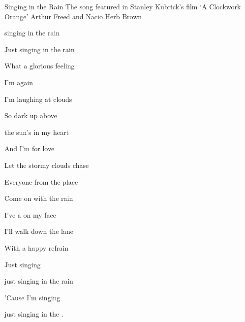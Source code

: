 \begin{SBSong}{Singing in the Rain}
  {The song featured in Stanley Kubrick's film `A Clockwork Orange'}
  {Arthur Freed and Nacio Herb Brown}
  \begin{SBVerse}
	 singing in the rain
	
	Just singing in the rain
	
	What a glorious feeling
	
	I'm  again

	I'm laughing at clouds
	
	So dark up above
	
	the sun's in my heart
	
	And I'm  for love

	Let the stormy clouds chase
	
	Everyone from the place
	
	Come on with the rain
	
	I've a  on my face

	I'll walk down the lane
	
	With a happy refrain
	
	Just singing
	
	just singing in the rain

	'Cause I'm singing
	
	just singing in the .
  \end{SBVerse}
\end{SBSong}
  